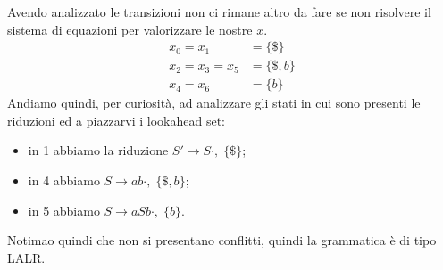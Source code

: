 \documentclass[class=book, crop=false, oneside, 12pt]{standalone}
\begin{document}
Avendo analizzato le transizioni non ci rimane altro da fare se non risolvere il sistema di equazioni per valorizzare le nostre \(x\).
\begin{align*}
    x_0 = x_1 &= \{\$\} \\
    x_2 = x_3 = x_5 &= \{\$, b\} \\
    x_4 = x_6 &= \{b\} 
\end{align*}
Andiamo quindi, per curiosità, ad analizzare gli stati in cui sono presenti le riduzioni ed a piazzarvi i lookahead set:
\begin{itemize}
    \item in 1 abbiamo la riduzione \(S' \to S \cdot, \; \{\$\}\);
    \item in 4 abbiamo \(S \to a b \cdot, \; \{\$, b\}\);
    \item in 5 abbiamo \(S \to aSb \cdot, \; \{b\}\).
\end{itemize}
Notimao quindi che non si presentano conflitti, quindi la grammatica è di tipo LALR.

\end{document}
